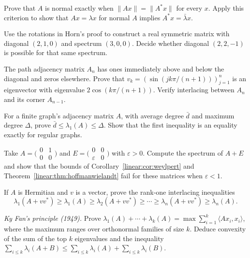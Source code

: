 \begin{exercise}[$\star$]\label{linear:ex:normaliff}
Prove that $A$ is normal exactly when $\|Ax\|=\|A^*x\|$ for every $x$. Apply this criterion to show that $Ax=\lambda x$ for normal $A$ implies $A^*x=\bar\lambda x$.
\end{exercise}
\begin{exercise}[$\star$]\label{linear:ex:hornsmall}
Use the rotations in Horn's proof to construct a real symmetric matrix with diagonal $(2,1,0)$ and spectrum $(3,0,0)$. Decide whether diagonal $(2,2,-1)$ is possible for that same spectrum.
\end{exercise}
\begin{exercise}[$\star$]\label{linear:ex:pathgraph}
The path adjacency matrix $A_n$ has ones immediately above and below the diagonal and zeros elsewhere. Prove that $v_k=(\sin(jk\pi/(n+1)))_{j=1}^n$ is an eigenvector with eigenvalue $2\cos(k\pi/(n+1))$. Verify interlacing between $A_n$ and its corner $A_{n-1}$.
\end{exercise}
\begin{exercise}[$\star\star$]\label{linear:ex:degree}
For a finite graph's adjacency matrix $A$, with average degree $\bar d$ and maximum degree $\Delta$, prove $\bar d\le\lambda_1(A)\le\Delta$. Show that the first inequality is an equality exactly for regular graphs.
\end{exercise}
\begin{exercise}[$\star$]\label{linear:ex:nonnormal}
Take $A=\bigl(\begin{smallmatrix}0&1\\0&0\end{smallmatrix}\bigr)$ and $E=\bigl(\begin{smallmatrix}0&0\\\varepsilon&0\end{smallmatrix}\bigr)$ with $\varepsilon>0$. Compute the spectrum of $A+E$ and show that the bounds of Corollary~\ref{linear:cor:weylpert} and Theorem~\ref{linear:thm:hoffmanwielandt} fail for these matrices when $\varepsilon<1$.
\end{exercise}
\begin{exercise}[$\star\star$]\label{linear:ex:rankone}
If $A$ is Hermitian and $v$ is a vector, prove the rank-one interlacing inequalities
\[\lambda_1(A+vv^*)\ge\lambda_1(A)\ge\lambda_2(A+vv^*)\ge\cdots\ge\lambda_n(A+vv^*)\ge\lambda_n(A).\]
\end{exercise}
\begin{exercise}[$\star\star$]\label{linear:ex:kyfan}
\emph{Ky Fan's principle (1949).} Prove $\lambda_1(A)+\cdots+\lambda_k(A)=\max\sum_{i=1}^k\langle Ax_i,x_i\rangle$, where the maximum ranges over orthonormal families of size $k$. Deduce convexity of the sum of the top $k$ eigenvalues and the inequality $\sum_{i\le k}\lambda_i(A+B)\le\sum_{i\le k}\lambda_i(A)+\sum_{i\le k}\lambda_i(B)$.
\end{exercise}
